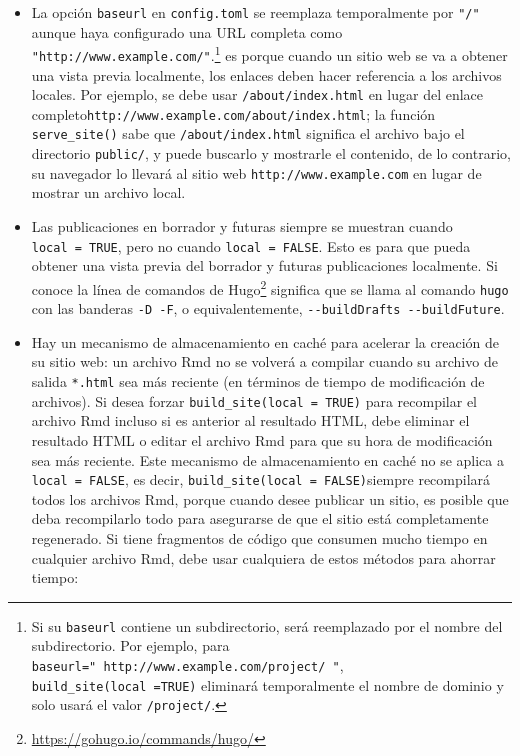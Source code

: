 \documentclass[12pt,]{krantz}
\renewcommand{\href}[2]{#2\footnote{\url{#1}}}
\theoremstyle{definition}
\theoremstyle{definition}
\theoremstyle{definition}
\theoremstyle{remark}
\begin{document}
\begin{itemize}
\item
  La opción \texttt{baseurl} en \texttt{config.toml} se reemplaza
  temporalmente por \texttt{"/"} aunque haya configurado una URL
  completa como \texttt{"http://www.example.com/"}.\footnote{Si su
    \texttt{baseurl} contiene un subdirectorio, será reemplazado por el
    nombre del subdirectorio. Por ejemplo, para
    \texttt{baseurl="\ http://www.example.com/project/\ "},
    \texttt{build\_site(local\ =TRUE)} eliminará temporalmente el nombre
    de dominio y solo usará el valor \texttt{/project/}.} es porque
  cuando un sitio web se va a obtener una vista previa localmente, los
  enlaces deben hacer referencia a los archivos locales. Por ejemplo, se
  debe usar \texttt{/about/index.html} en lugar del enlace
  completo\texttt{http://www.example.com/about/index.html}; la función
  \texttt{serve\_site()} sabe que \texttt{/about/index.html} significa
  el archivo bajo el directorio \texttt{public/}, y puede buscarlo y
  mostrarle el contenido, de lo contrario, su navegador lo llevará al
  sitio web \texttt{http://www.example.com} en lugar de mostrar un
  archivo local.
\item
  Las publicaciones en borrador y futuras siempre se muestran cuando
  \texttt{local\ =\ TRUE}, pero no cuando \texttt{local\ =\ FALSE}. Esto
  es para que pueda obtener una vista previa del borrador y futuras
  publicaciones localmente. Si conoce la
  \href{https://gohugo.io/commands/hugo/}{línea de comandos de Hugo}
  significa que se llama al comando \texttt{hugo} con las banderas
  \texttt{-D\ -F}, o equivalentemente,
  \texttt{-\/-buildDrafts\ -\/-buildFuture}.
\item
  Hay un mecanismo de almacenamiento en caché para acelerar la creación
  de su sitio web: un archivo Rmd no se volverá a compilar cuando su
  archivo de salida \texttt{*.html} sea más reciente (en términos de
  tiempo de modificación de archivos). Si desea forzar
  \texttt{build\_site(local\ =\ TRUE)} para recompilar el archivo Rmd
  incluso si es anterior al resultado HTML, debe eliminar el resultado
  HTML o editar el archivo Rmd para que su hora de modificación sea más
  reciente. Este mecanismo de almacenamiento en caché no se aplica a
  \texttt{local\ =\ FALSE}, es decir,
  \texttt{build\_site(local\ =\ FALSE)}siempre recompilará todos los
  archivos Rmd, porque cuando desee publicar un sitio, es posible que
  deba recompilarlo todo para asegurarse de que el sitio está
  completamente regenerado. Si tiene fragmentos de código que consumen
  mucho tiempo en cualquier archivo Rmd, debe usar cualquiera de estos
  métodos para ahorrar tiempo:


\end{itemize}
\end{document}
